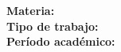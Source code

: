 \begin{titlepage}
    \vfill
    
    {\large\textbf{Materia:} \GetCourse} \\
    \vspace{0.3cm}
    {\large\textbf{Tipo de trabajo:} \GetThesisType} \\
    \vspace{0.3cm}
    {\large\textbf{Período académico:} \GetAcademicYear}
    
    \vspace{1cm}
    
    {\large\GetDate}
    
\end{titlepage}
